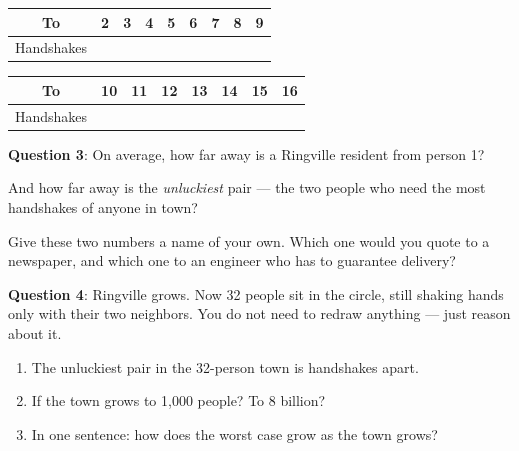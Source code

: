 \documentclass[a4paper, 14pt]{extarticle}
\begin{document}
\begin{center}
\begin{tabular}{|c|p{0.7cm}|p{0.7cm}|p{0.7cm}|p{0.7cm}|p{0.7cm}|p{0.7cm}|p{0.7cm}|p{0.7cm}|}
\hline
To & 2 & 3 & 4 & 5 & 6 & 7 & 8 & 9 \\
\hline
Handshakes & & & & & & & & \\[0.5cm]
\hline
\end{tabular}

\vspace{0.3cm}

\begin{tabular}{|c|p{0.7cm}|p{0.7cm}|p{0.7cm}|p{0.7cm}|p{0.7cm}|p{0.7cm}|p{0.7cm}|}
\hline
To & 10 & 11 & 12 & 13 & 14 & 15 & 16 \\
\hline
Handshakes & & & & & & & \\[0.5cm]
\hline
\end{tabular}
\end{center}

{\bf Question 3}:
On average, how far away is a Ringville resident from person 1?
\underline{\hspace{2cm}}

And how far away is the \emph{unluckiest} pair --- the two people who need the
most handshakes of anyone in town? \underline{\hspace{2cm}}

Give these two numbers a name of your own. Which one would you quote to a
newspaper, and which one to an engineer who has to guarantee delivery?

\underline{\hspace{\textwidth}}

\clearpage

{\bf Question 4}:
Ringville grows. Now 32 people sit in the circle, still shaking hands only with
their two neighbors. You do not need to redraw anything --- just reason about it.

\begin{enumerate}
    \item The unluckiest pair in the 32-person town is \underline{\hspace{2cm}}
          handshakes apart.
    \item If the town grows to 1{,}000 people? \underline{\hspace{2cm}}
          To 8 billion? \underline{\hspace{2cm}}
    \item In one sentence: how does the worst case grow as the town grows?

    \underline{\hspace{\textwidth}}
\end{enumerate}
\end{document}
